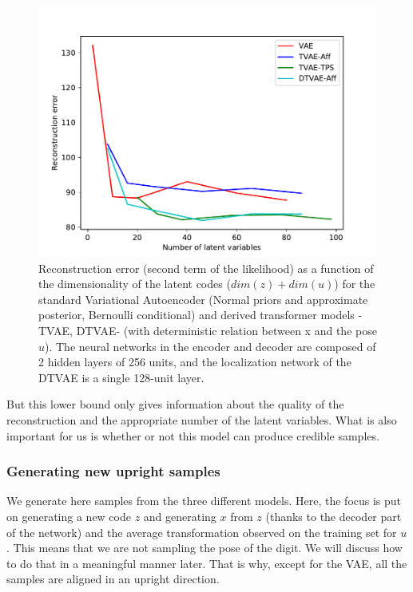 \documentclass[letterpaper, twoside]{article}
\begin{document}
\begin{figure}[h]
\centering
\includegraphics[scale=0.6]{num_latent.pdf}
\caption{Reconstruction error (second term of the likelihood) as a function of the dimensionality of the latent codes ($dim(z) + dim(u)$) for the standard Variational Autoencoder (Normal priors and approximate posterior, Bernoulli conditional) and derived transformer models -TVAE, DTVAE- (with deterministic relation between x and the pose $u$). The neural networks in the encoder and decoder are composed of 2 hidden layers of 256 units, and the localization network of the DTVAE is a single 128-unit layer.}
\label{numlatent}
\end{figure}

But this lower bound only gives information about the quality of the reconstruction and the appropriate number of the latent variables. What is also important for us is whether or not this model can produce credible samples.\\

  \subsubsection{Generating new upright samples}

We generate here samples from the three different models. Here, the focus is put on generating a new code $z$ and generating $x$ from $z$ (thanks to the decoder part of the network) and the average transformation observed on the training set for $u$. This means that we are not sampling the pose of the digit. We will discuss how to do that in a meaningful manner later. That is why, except for the VAE, all the samples are aligned in an upright direction.\\
\end{document}
